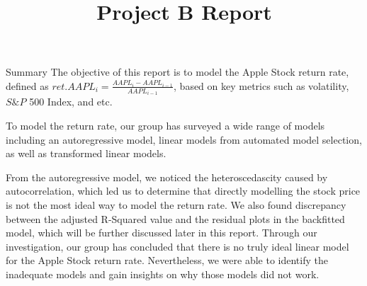 \documentclass[]{article}
\title{\bf{Project B Report}}
\author{}
\date{}
\begin{document}
\maketitle

\begin{section}{Summary}
The objective of this report is to model the Apple Stock return rate, defined as $ret.AAPL_i = \frac{AAPL_i - AAPL_{i-1}}{AAPL_{i-1}}$, based on key metrics such as volatility, $S\&P$ 500 Index, and etc. 

To model the return rate, our group has surveyed a wide range of models including an autoregressive model, linear models from automated model selection, as well as transformed linear models. 

From the autoregressive model, we noticed the heteroscedascity caused by autocorrelation, which led us to determine that directly modelling the stock price is not the most ideal way to model the return rate. We also found discrepancy between the adjusted R-Squared value and the residual plots in the backfitted model, which will be further discussed later in this report. Through our investigation, our group has concluded that there is no truly ideal linear model for the Apple Stock return rate. Nevertheless, we were able to identify the inadequate models and gain insights on why those models did not work.
\end{section}
\end{document}
